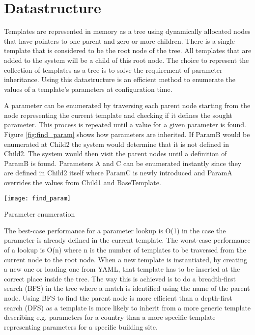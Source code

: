 \section{Datastructure}
Templates are represented in memory as a tree using dynamically allocated nodes that have pointers to one parent and zero or more children.
There is a single template that is considered to be the root node of the tree.
All templates that are added to the system will be a child of this root node.
The choice to represent the collection of templates as a tree is to solve the requirement of parameter inheritance.
Using this datastructure is an efficient method to enumerate the values of a template's parameters at configuration time.

A parameter can be enumerated by traversing each parent node starting from the node representing the current template and checking if it defines the sought parameter.
This process is repeated until a value for a given parameter is found.
Figure \ref{fig:find_param} shows how parameters are inherited.
If ParamB would be enumerated at Child2 the system would determine that it is not defined in Child2.
The system would then visit the parent nodes until a definition of ParamB is found.
Parameters A and C can be enumerated instantly since they are defined in Child2 itself where ParamC is newly introduced and ParamA overrides the values from Child1 and BaseTemplate.
\begin{marginfigure}
	\centering
	\texttt{[image: find\_param]}
	\caption{Parameter enumeration}
	\label{fig:find_param}
\end{marginfigure}
The best-case performance for a parameter lookup is O(1) in the case the parameter is already defined in the current template.
The worst-case performance of a lookup is O(n) where n is the number of templates to be traversed from the current node to the root node.
When a new template is instantiated, by creating a new one or loading one from YAML, that template has to be inserted at the correct place inside the tree.
The way this is achieved is to do a breadth-first search (BFS) in the tree where a match is identified using the name of the parent node.
Using BFS to find the parent node is more efficient than a depth-first search (DFS) as a template is more likely to inherit from a more generic template describing e.g. parameters for a country than a more specific template representing parameters for a specific building site. %

